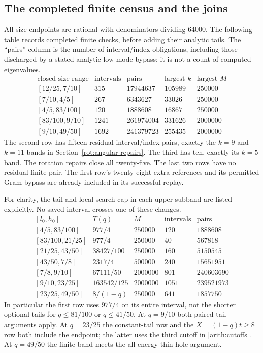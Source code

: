 \documentclass[11pt,reqno]{amsart}
\numberwithin{equation}{section}
\begin{document}
\subsection{The completed finite census and the joins}

All size endpoints are rational with denominators dividing $64000$.
The following table records completed finite checks, before adding their
analytic tails.  The ``pairs'' column is the number of interval/index
obligations, including those discharged by a stated analytic low-mode
bypass; it is not a count of computed eigenvalues.
\begin{equation}\label{arith:census-table}
\begin{array}{c|r|r|r|r}
 \text{closed size range}&\text{intervals}&\text{pairs}&
            \text{largest }k&\text{largest }M\\ \hline
 [12/25,7/10]&315&17944637&105989&250000\\
 {[7/10,4/5]}&267&6343627&33026&250000\\
 {[4/5,83/100]}&120&1888608&16867&250000\\
 {[83/100,9/10]}&1241&261974004&331626&2000000\\
 {[9/10,49/50]}&1692&241379723&255435&2000000
\end{array}
\end{equation}
The second row has fifteen residual interval/index pairs, exactly the
$k=9$ and $k=11$ bands in Section~\ref{rot:angular-repairs}.  The third has
ten, exactly its $k=5$ band.  The rotation repairs close all twenty-five.
The last two rows have no residual finite pair.  The first row's
twenty-eight extra references and its permitted Gram bypass are already
included in its successful replay.

For clarity, the tail and local search cap in each upper subband are
listed explicitly.  No saved interval crosses one of these changes.
\begin{equation}\label{arith:upper-subband-table}
\begin{array}{c|c|r|r|r}
 [l_0,h_0]&T(q)&M&\text{intervals}&\text{pairs}\\ \hline
 [4/5,83/100]&977/4&250000&120&1888608\\
 {[83/100,21/25]}&977/4&250000&40&567818\\
 {[21/25,43/50]}&38427/100&250000&160&5150545\\
 {[43/50,7/8]}&2317/4&500000&240&15651951\\
 {[7/8,9/10]}&67111/50&2000000&801&240603690\\
 {[9/10,23/25]}&163542/125&2000000&1051&239521973\\
 {[23/25,49/50]}&8/(1-q)&250000&641&1857750
\end{array}
\end{equation}
In particular the first row uses $977/4$ on its entire interval, not
the shorter optional tails for $q\le81/100$ or $q\le41/50$.
At $q=9/10$ both paired-tail arguments apply.  At $q=23/25$ the
constant-tail row and the $X=(1-q)t\ge8$ row both include the endpoint;
the latter uses the third cutoff in \eqref{arith:cutoffs}.
At $q=49/50$ the finite band meets the all-energy thin-hole argument.
\end{document}
